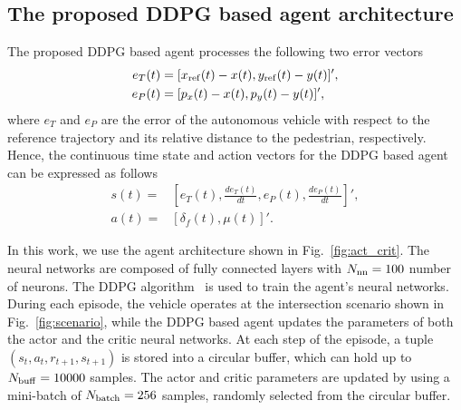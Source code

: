 \subsection{The proposed DDPG based agent architecture}
\label{sub_sec:3-d}
The proposed DDPG based agent processes the following two error vectors
\begin{equation}
\centering   
\begin{aligned}
	e_T(t) &= [ x_{\rm ref}(t)-x(t), y_{\rm ref}(t)-y(t)]',  \\
	e_P(t) &= [p_x(t)-x(t), p_y(t)-y(t)]',  \\
\end{aligned}
\end{equation}
\noindent where $e_T$ and $e_P$ are  the error of the autonomous vehicle with respect to the reference trajectory and its relative distance to the pedestrian, respectively. Hence, the continuous time state and action vectors for the DDPG based agent can be expressed as follows  
\begin{equation}
\label{Eq:state_action}
\begin{aligned}
	s(t)=&[e_T(t), \frac{de_T(t)}{dt}, e_P(t), \frac{de_P(t)}{dt}]', \\
	a(t)=&[\delta_f(t), \mu(t)]'.
\end{aligned}
\end{equation}

In this work, we use the agent architecture shown in Fig.~\ref{fig:act_crit}. The neural networks are composed of fully connected layers with $N_{\rm nn}=100$ number of neurons.
The DDPG algorithm~\cite{DDPG} is used to train the agent's neural networks. During each episode, the vehicle operates at the intersection scenario shown in Fig.~\ref{fig:scenario}, while the DDPG based agent updates the parameters of both the actor and the critic neural networks. At each step of the episode, a tuple $\left(s_t, a_t, r_{t+1}, s_{t+1}\right)$ is stored into a circular buffer, which can hold up to \mbox{$N_{\rm buff}=10000$} samples. The actor and critic parameters are updated by using a mini-batch of $N_{\rm batch}=256$ samples, randomly selected  from the circular buffer. 

